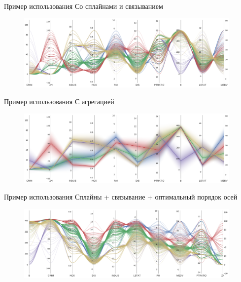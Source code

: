 \documentclass[fleqn, xcolor=x11names]{beamer}
\begin{document}
\begin{frame}{Пример использования}
    Со сплайнами и связыванием

    \begin{figure}[htb]
        \centering
        \includegraphics[width=11cm]{housing_example_2.pdf}
    \end{figure}
\end{frame}

\begin{frame}{Пример использования}
    С агрегацией

    \begin{figure}[htb]
        \centering
        \includegraphics[width=11cm]{housing_example_3.pdf}
    \end{figure}
\end{frame}

\begin{frame}{Пример использования}
    Сплайны + связывание + оптимальный порядок осей

    \begin{figure}[htb]
        \centering
        \includegraphics[width=11cm]{housing_example_4.pdf}
    \end{figure}
\end{frame}
\end{document}
